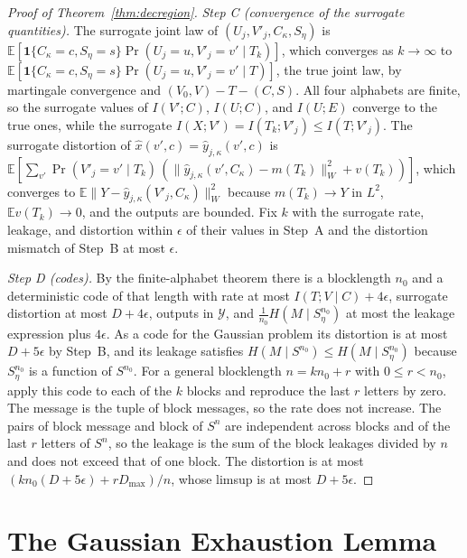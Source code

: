 \documentclass[11pt,onecolumn]{IEEEtran}
\newcommand{\E}{\mathbb{E}}
\begin{document}
\begin{proof}[Proof of Theorem~\ref{thm:decregion}]
\emph{Step C (convergence of the surrogate quantities).} The surrogate
joint law of $(U_j,V'_j,C_\kappa,S_\eta)$ is
$\E[\mathbf 1\{C_\kappa=c,S_\eta=s\}\Pr(U_j=u,V'_j=v'\mid T_k)]$, which converges
as $k\to\infty$ to $\E[\mathbf 1\{C_\kappa=c,S_\eta=s\}\Pr(U_j=u,V'_j=v'\mid T)]$,
the true joint law, by martingale convergence and $(V_0,V)-T-(C,S)$. All
four alphabets are finite, so the surrogate values of $I(V';C)$,
$I(U;C)$, and $I(U;E)$ converge to the true ones, while the surrogate
$I(X;V')=I(T_k;V'_j)\le I(T;V'_j)$. The surrogate distortion of
$\hat x(v',c)=\hat y_{j,\kappa}(v',c)$ is
$\E[\sum_{v'}\Pr(V'_j=v'\mid T_k)\,(\|\hat y_{j,\kappa}(v',C_\kappa)-m(T_k)\|_W^2+v(T_k))]$,
which converges to $\E\|Y-\hat y_{j,\kappa}(V'_j,C_\kappa)\|_W^2$ because
$m(T_k)\to Y$ in $L^2$, $\E v(T_k)\to0$, and the outputs are bounded. Fix
$k$ with the surrogate rate, leakage, and distortion within $\epsilon$ of
their values in Step~A and the distortion mismatch of Step~B at most
$\epsilon$.

\emph{Step D (codes).} By the finite-alphabet theorem there is a
blocklength $n_0$ and a deterministic code of that length with rate at
most $I(T;V\mid C)+4\epsilon$, surrogate distortion at most $D+4\epsilon$,
outputs in $\mathcal Y$, and $\tfrac1{n_0}H(M\mid S_\eta^{n_0})$ at most the
leakage expression plus $4\epsilon$. As a code for the Gaussian problem
its distortion is at most $D+5\epsilon$ by Step~B, and its leakage
satisfies $H(M\mid S^{n_0})\le H(M\mid S_\eta^{n_0})$ because $S_\eta^{n_0}$
is a function of $S^{n_0}$. For a general blocklength $n=kn_0+r$ with
$0\le r<n_0$, apply this code to each of the $k$ blocks and reproduce the
last $r$ letters by zero. The message is the tuple of block messages, so
the rate does not increase. The pairs of block message and block of
$S^n$ are independent across blocks and of the last $r$ letters of
$S^n$, so the leakage is the sum of the
block leakages divided by $n$ and does not exceed that of one block. The
distortion is at most $(kn_0(D+5\epsilon)+rD_{\max})/n$, whose limsup is
at most $D+5\epsilon$.
\end{proof}

\section{The Gaussian Exhaustion Lemma}
\label{app:exhaust}
\end{document}
